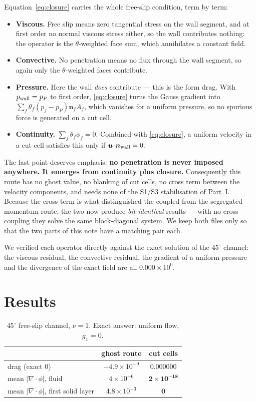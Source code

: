 \documentclass[11pt,a4paper]{article}
\newcommand{\uu}{\bm{u}}
\newcommand{\nn}{\bm{n}}
\begin{document}
Equation~\eqref{eq:closure} carries the whole free-slip condition, term by term:

\begin{itemize}
\item \textbf{Viscous.} Free slip means zero tangential stress on the wall segment, and at
first order no normal viscous stress either, so the wall contributes nothing: the operator is
the $\theta$-weighted face sum, which annihilates a constant field.
\item \textbf{Convective.} No penetration means no flux through the wall segment, so again
only the $\theta$-weighted faces contribute.
\item \textbf{Pressure.} Here the wall \emph{does} contribute --- this is the form drag. With
$p_{\rm wall}=p_P$ to first order, \eqref{eq:closure} turns the Gauss gradient into
$\sum_f\theta_f(p_f-p_P)\nn_fA_f$, which vanishes for a uniform pressure, so no spurious force
is generated on a cut cell.
\item \textbf{Continuity.} $\sum_f\theta_f\phi_f=0$. Combined with \eqref{eq:closure}, a
uniform velocity in a cut cell satisfies this only if $\uu\!\cdot\!\nn_{\rm wall}=0$.
\end{itemize}

The last point deserves emphasis: \textbf{no penetration is never imposed anywhere. It emerges
from continuity plus closure.} Consequently this route has no ghost value, no blanking of cut
cells, no cross term between the velocity components, and needs none of the S1/S3
stabilisation of Part~I. Because the cross term is what distinguished the coupled from the
segregated momentum route, the two now produce \emph{bit-identical} results --- with no cross
coupling they solve the same block-diagonal system. We keep both files only so that the two
parts of this note have a matching pair each.

We verified each operator directly against the exact solution of the $45^\circ$ channel: the
viscous residual, the convective residual, the gradient of a uniform pressure and the
divergence of the exact field are all $0.000\times10^{0}$.

\section{Results}

\begin{table}[h]\centering
\caption{$45^\circ$ free-slip channel, $\nu=1$. Exact answer: uniform flow, $g_x=0$.}
\label{tab:cc45}
\begin{tabular}{lcc}
\toprule
 & ghost route & cut cells\\
\midrule
drag (exact $0$)                                   & $-4.9\times10^{-9}$ & $\bm{0.000000}$\\
mean $|\nabla\!\cdot\!\phi|$, fluid                & $4\times10^{-6}$    & $\bm{2\times10^{-18}}$\\
mean $|\nabla\!\cdot\!\phi|$, first solid layer    & $4.8\times10^{-3}$  & $\bm{0}$\\
\bottomrule
\end{tabular}
\end{table}
\end{document}

